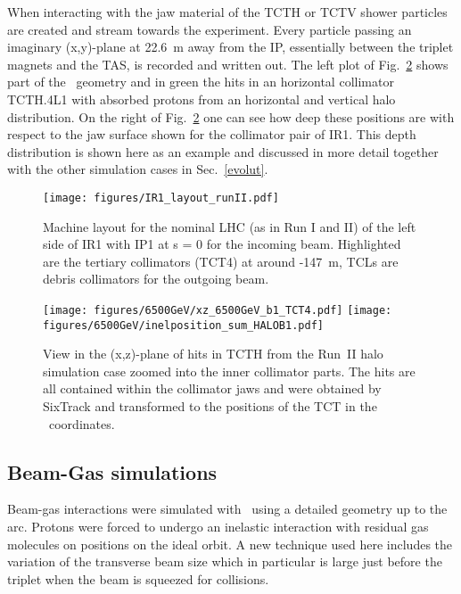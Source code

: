 When interacting with the jaw material of the TCTH or TCTV shower particles are created and stream towards the experiment. Every particle passing an imaginary (x,y)-plane at 22.6~m away from the IP, essentially between the triplet magnets and the TAS, is recorded and written out. The left plot of Fig.~\ref{tctHits} shows part of the \fluka~geometry and in green the hits in an horizontal collimator TCTH.4L1 with absorbed protons from an horizontal and vertical halo distribution. On the right of Fig.~\ref{tctHits} one can see how deep these positions are with respect to the jaw surface shown for the collimator pair of IR1. This depth distribution is shown here as an example and discussed in more detail together with the other simulation cases in Sec.~\ref{evolut}.

\begin{figure}%
\begin{center}
\texttt{[image: figures/IR1\_layout\_runII.pdf]}
\end{center}
\vspace{-0.6cm}
 \caption{Machine layout for the nominal LHC (as in Run I and II) of the left side of IR1 with IP1 at s = 0 for the incoming beam. Highlighted are the tertiary collimators (TCT4) at around -147~m, TCLs are debris collimators for the outgoing beam.
  \label{nominalLHC_layout}}
\end{figure}

\begin{figure}%
\begin{center}
  \texttt{[image: figures/6500GeV/xz\_6500GeV\_b1\_TCT4.pdf]}
  \texttt{[image: figures/6500GeV/inelposition\_sum\_HALOB1.pdf]}
\end{center}
\vspace{-0.6cm}
 \caption{View in the (x,z)-plane of hits in TCTH from the Run~II halo simulation case zoomed into the inner collimator parts. The hits are all contained within the collimator jaws and were obtained by SixTrack and transformed to the positions of the TCT in the \fluka~coordinates.
  \label{tctHits}}
\end{figure}


\subsection{Beam-Gas simulations}
Beam-gas interactions were simulated with \fluka~using a detailed geometry up to the arc. %
 Protons were forced to undergo an inelastic interaction with residual gas molecules on positions on the ideal orbit. A new technique used here includes the variation of the transverse beam size which in particular is large just before the triplet when the beam is squeezed for collisions.

